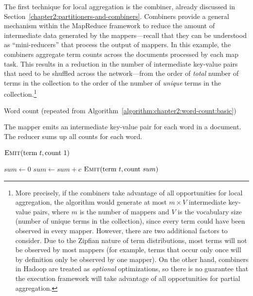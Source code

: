 The first technique for local aggregation is the combiner, already
discussed in Section~\ref{chapter2:partitioners-and-combiners}.
Combiners provide a general mechanism within the MapReduce framework
to reduce the amount of intermediate data generated by the
mappers---recall that they can be understood as ``mini-reducers'' that
process the output of mappers.  In this example, the combiners
aggregate term counts across the documents processed by each map task.
This results in a reduction in the number of intermediate key-value
pairs that need to be shuffled across the network---from the order of
\emph{total} number of terms in the collection to the order of the
number of \emph{unique} terms in the collection.\footnote{More
  precisely, if the combiners take advantage of all opportunities for
  local aggregation, the algorithm would generate at most $m \times V$
  intermediate key-value pairs, where $m$ is the number of mappers and
  $V$ is the vocabulary size (number of unique terms in the
  collection), since every term could have been observed in every
  mapper.  However, there are two additional factors to consider.  Due
  to the Zipfian nature of term distributions, most terms will not be
  observed by most mappers (for example, terms that occur only once
  will by definition only be observed by one mapper).  On the other
  hand, combiners in Hadoop are treated as \emph{optional}
  optimizations, so there is no guarantee that the execution framework
  will take advantage of all opportunities for partial aggregation.}

\begin{algorithm}[t]
  \caption{Word count (repeated from Algorithm~\ref{algorithm:chapter2:word-count:basic})}
\label{algorithm:chapter3:word-count:basic}
The mapper emits an intermediate key-value pair for each word in a
document. The reducer sums up all counts for each word.
\algrenewcommand{}
\algrenewcommand{}
  \begin{algorithmic}[1]
    \State $\textsc{Emit}(\textrm{term }t, \textrm{count }1)$
    \EndFor
    \EndProcedure
    \EndFunction
  \end{algorithmic}

  \begin{algorithmic}[1]
    \State $sum \gets 0$
    \State $sum \gets sum + c$
    \EndFor
    \State $\textsc{Emit}(\textrm{term }t, \textrm{count }sum)$
    \EndProcedure
    \EndFunction
  \end{algorithmic}
\end{algorithm}

